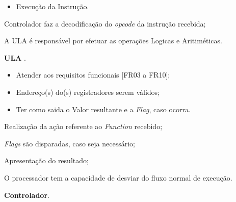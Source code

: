 \documentclass{article}
\begin{document}
  \postconditions
    \begin{itemize}
     \item Execução da Instrução.
    \end{itemize}

  
  \begin{mainflow}
    \item Controlador faz a decodificação do \textit{opcode} da instrução recebida;
  \end{mainflow}

  A ULA é responsável por efetuar as operações Logicas e Aritiméticas.
  
  \actors
    \begin{description}
     \item \textbf{ULA} .
    \end{description}
    
  \preconditions 
    \begin{itemize}
     \item Atender aos requisitos funcionais [FR03 a FR10];
     \item Endereço(s) do(s) registradores serem válidos;
    \end{itemize}

  \postconditions
    \begin{itemize}
     \item Ter como saida o Valor resultante e a  \textit{Flag}, caso ocorra.
    \end{itemize}
  
  
  \begin{mainflow}
    \item Realização da ação referente ao \textit{Function} recebido;
    \item \textit{Flags} são disparadas, caso seja necessário;
    \item Apresentação do resultado;
  \end{mainflow}

   O processador tem a capacidade de desviar do fluxo normal de execução.
  
  \actors
    \begin{description}
     \item \textbf{Controlador}.
    \end{description}
    
\end{document}
